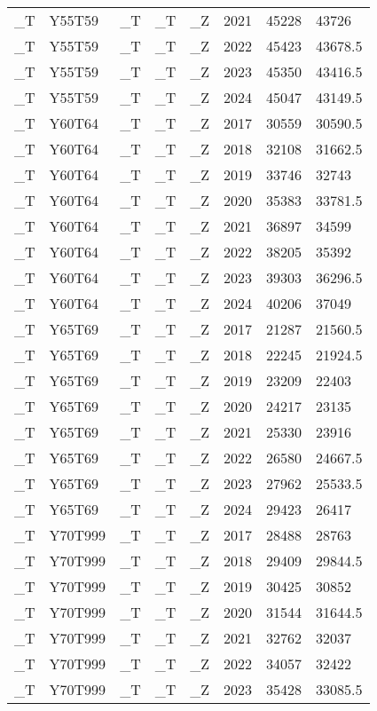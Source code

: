 \begin{longtable}[t]{llllllll}
\_T & Y55T59 & \_T & \_T & \_Z & 2021 & 45228 & 43726\\
\_T & Y55T59 & \_T & \_T & \_Z & 2022 & 45423 & 43678.5\\
\_T & Y55T59 & \_T & \_T & \_Z & 2023 & 45350 & 43416.5\\
\addlinespace
\_T & Y55T59 & \_T & \_T & \_Z & 2024 & 45047 & 43149.5\\
\_T & Y60T64 & \_T & \_T & \_Z & 2017 & 30559 & 30590.5\\
\_T & Y60T64 & \_T & \_T & \_Z & 2018 & 32108 & 31662.5\\
\_T & Y60T64 & \_T & \_T & \_Z & 2019 & 33746 & 32743\\
\_T & Y60T64 & \_T & \_T & \_Z & 2020 & 35383 & 33781.5\\
\addlinespace
\_T & Y60T64 & \_T & \_T & \_Z & 2021 & 36897 & 34599\\
\_T & Y60T64 & \_T & \_T & \_Z & 2022 & 38205 & 35392\\
\_T & Y60T64 & \_T & \_T & \_Z & 2023 & 39303 & 36296.5\\
\_T & Y60T64 & \_T & \_T & \_Z & 2024 & 40206 & 37049\\
\_T & Y65T69 & \_T & \_T & \_Z & 2017 & 21287 & 21560.5\\
\addlinespace
\_T & Y65T69 & \_T & \_T & \_Z & 2018 & 22245 & 21924.5\\
\_T & Y65T69 & \_T & \_T & \_Z & 2019 & 23209 & 22403\\
\_T & Y65T69 & \_T & \_T & \_Z & 2020 & 24217 & 23135\\
\_T & Y65T69 & \_T & \_T & \_Z & 2021 & 25330 & 23916\\
\_T & Y65T69 & \_T & \_T & \_Z & 2022 & 26580 & 24667.5\\
\addlinespace
\_T & Y65T69 & \_T & \_T & \_Z & 2023 & 27962 & 25533.5\\
\_T & Y65T69 & \_T & \_T & \_Z & 2024 & 29423 & 26417\\
\_T & Y70T999 & \_T & \_T & \_Z & 2017 & 28488 & 28763\\
\_T & Y70T999 & \_T & \_T & \_Z & 2018 & 29409 & 29844.5\\
\_T & Y70T999 & \_T & \_T & \_Z & 2019 & 30425 & 30852\\
\addlinespace
\_T & Y70T999 & \_T & \_T & \_Z & 2020 & 31544 & 31644.5\\
\_T & Y70T999 & \_T & \_T & \_Z & 2021 & 32762 & 32037\\
\_T & Y70T999 & \_T & \_T & \_Z & 2022 & 34057 & 32422\\
\_T & Y70T999 & \_T & \_T & \_Z & 2023 & 35428 & 33085.5\\

\end{longtable}
